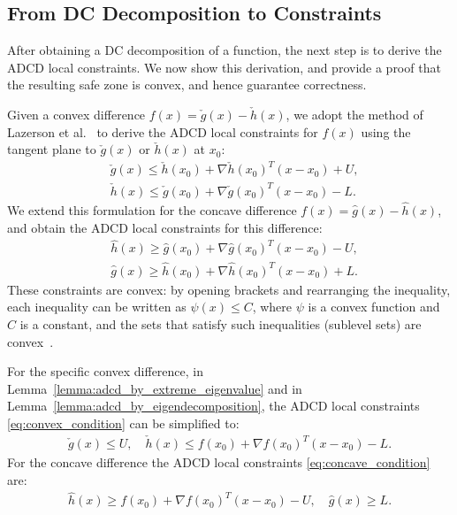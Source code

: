 \subsection{From DC Decomposition to Constraints} 
\label{sub_sec:adcd}

After obtaining a DC decomposition of a function, the next step is to derive the ADCD local constraints.
We now show this derivation, and provide a proof that the resulting safe zone is convex, and hence guarantee correctness.

Given a convex difference $f(x) = \check{g}(x) -  \check{h}(x)$, 
we adopt the method of Lazerson et al.~\cite{lazerson:lightweight_monitoring} to derive the ADCD local constraints for $f(x)$ using the tangent plane to $\check{g}(x)$ or $\check{h}(x)$ at $x_0$:
\begin{subequations} \label{eq:convex_condition}
	\begin{align}
	&  \check{g}(x) \le \check{h}(x_0) + \nabla \check{h}(x_0)^T (x - x_0) + U, \\
	& \check{h}(x) \le \check{g}(x_0) + \nabla \check{g}(x_0)^T (x - x_0) - L.
	\end{align}
\end{subequations}
We extend this formulation for the concave difference $f(x) = \hat{g}(x) - \hat{h}(x)$, and obtain the ADCD local constraints for this difference:
\begin{subequations} \label{eq:concave_condition}
	\begin{align}
	& \hat{h}(x) \ge \hat{g}(x_0) + \nabla \hat{g}(x_0)^T (x - x_0) - U, \\
	& \hat{g}(x) \ge \hat{h}(x_0) + \nabla \hat{h}(x_0)^T (x - x_0) + L.
	\end{align}
\end{subequations}
These constraints are convex:
by opening brackets and rearranging the inequality, each inequality can be written as $\psi(x) \le C$, where $\psi$ is a convex function and $C$ is a constant, and the sets that satisfy such inequalities (sublevel sets) are convex~\cite{boyd_convex_2004}.


For the specific convex difference, in Lemma~\ref{lemma:adcd_by_extreme_eigenvalue} and in Lemma~\ref{lemma:adcd_by_eigendecomposition}, the ADCD local constraints \eqref{eq:convex_condition} can be simplified to:
\begin{align*}
\check{g}(x) \le U,\quad
\check{h}(x) \le f(x_0) + \nabla f(x_0)^T (x - x_0) - L.
\end{align*}
For the concave difference the ADCD local constraints \eqref{eq:concave_condition} are:
\begin{align*}
\hat{h}(x) \ge f(x_0) + \nabla f(x_0)^T (x - x_0) - U,\quad
\hat{g}(x) \ge L.
\end{align*}

